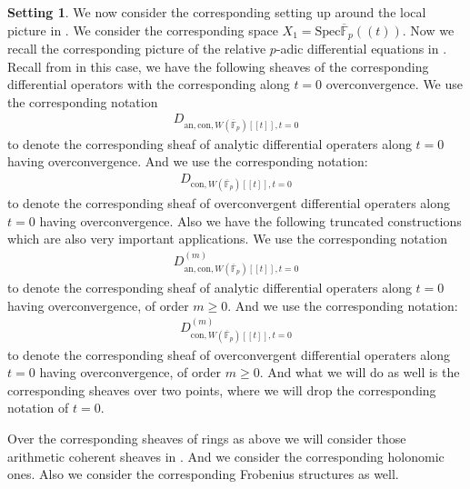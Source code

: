 \documentclass[11pt]{book}
\theoremstyle{definition}
\numberwithin{equation}{section}
\newtheorem{setting}[theorem]{Setting}
\begin{document}
\begin{setting}
\indent We now consider the corresponding setting up around the local picture in \cite{AM}. We consider the corresponding space $X_1=\mathrm{Spec}\overline{\mathbb{F}}_p((t))$. Now we recall the corresponding picture of the relative $p$-adic differential equations in \cite{AM}. Recall from \cite[Section 2.1.2,2.1.3]{AM} in this case, we have the following sheaves of the corresponding differential operators with the corresponding along $t=0$ overconvergence. We use the corresponding notation
\begin{align}
D_{\mathrm{an},\mathrm{con},W(\overline{\mathbb{F}}_p)[[t]],t=0}	
\end{align}
to denote the corresponding sheaf of analytic differential operaters along $t=0$ having overconvergence. And we use the corresponding notation:
\begin{align}
D_{\mathrm{con},W(\overline{\mathbb{F}}_p)[[t]],t=0}	
\end{align}
to denote the corresponding sheaf of overconvergent differential operaters along $t=0$ having overconvergence. Also we have the following truncated constructions which are also very important applications. We use the corresponding notation
\begin{align}
D^{(m)}_{\mathrm{an},\mathrm{con},W(\overline{\mathbb{F}}_p)[[t]],t=0}	
\end{align}
to denote the corresponding sheaf of analytic differential operaters along $t=0$ having overconvergence, of order $m\geq 0$. And we use the corresponding notation:
\begin{align}
D^{(m)}_{\mathrm{con},W(\overline{\mathbb{F}}_p)[[t]],t=0}	
\end{align}
to denote the corresponding sheaf of overconvergent differential operaters along $t=0$ having overconvergence, of order $m\geq 0$. And what we will do as well is the corresponding sheaves over two points, where we will drop the corresponding notation of $t=0$.
\end{setting}


\indent Over the corresponding sheaves of rings as above we will consider those arithmetic coherent sheaves in \cite[Section 2.1.2,2.1.3,2.1.4]{AM}. And we consider the corresponding holonomic ones. Also we consider the corresponding Frobenius structures as well.
\end{document}
